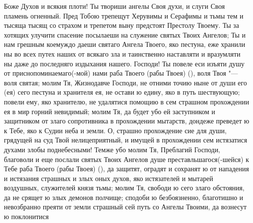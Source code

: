 \begin{mymulticols}
 


Боже Духов и всякия плоти! Ты твориши ангелы Своя духи, и слуги Своя пламень огненный. Пред Тобою трепещут Херувимы и Серафимы и тьмы тем и тысяща тысящ со страхом и трепетом выну предстоят Престолу Твоему. Ты за хотящих улучити спасение посылаеши на служение святых Твоих Ангелов; Ты и нам грешным коемуждо даеши святаго Ангела Твоего, яко пестуна, еже хранили ны во всех путех наших от всякаго зла и таинственно наставляти и вразумляти ны даже до последняго издыхания нашего. Господи! Ты повеле еси изъяти душу от приснопоминаемаго(-мой) нами раба Твоего (рабы Твоея) (), воля Твоя "--- воля святая; молим Тя, Жизнодавче Господи, не отними точию ныне от души его (ея) сего пестуна и хранителя ея, не остави ю едину, яко в путь шествующую; повели ему, яко хранителю, не удалятися помощию в сем страшном прохождении ея в мир горний невидимый; молим Тя, да будет убо ей заступником и защитником от злаго сопротивника в прохождении мытарств, дондеже преведет ю к Тебе, яко к Судии неба и земли. О, страшно прохождение сие для души, грядущей на суд Твой нелицеприятный, и имущей в прохождении сем истязатися духами злобы поднебесными! Темже убо молим Тя, Преблагий Господи, благоволи и еще послали святых Твоих Ангелов душе преставльшагося(-шейся) к Тебе раба Твоего (рабы Твоея) (), да защитят, оградят и сохранят ю от нападения и истязания страшных и злых оных духов, яко истязателей и мытарей воздушных, служителей князя тьмы; молим Тя, свободи ю сего злаго обстояния, да не срящет ю злых демонов полчище; сподоби ю безбоязненно, благотишно и невозбранно преяти от земли страшный сей путь со Ангелы Твоими, да вознесут ю поклонитися 

\end{mymulticols}

\mychapterending



